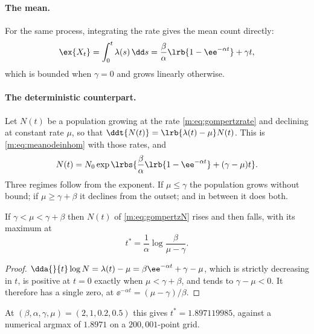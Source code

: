\paragraph{The mean.}
For the same process, integrating the rate gives the mean count directly:
\begin{equation}
\ex{X_t}=\int_0^t\lambda(s)\,\dd s
=\frac{\beta}{\alpha}\lrb{1-\ee^{-\alpha t}}+\gamma t,
\label{m:eq:gompertzmean}
\end{equation}
which is bounded when $\gamma=0$ and grows linearly otherwise.

\paragraph{The deterministic counterpart.}
Let $N(t)$ be a population growing at the rate \cref{m:eq:gompertzrate} and
declining at constant rate $\mu$, so that
$\ddt{N(t)}=\lrb{\lambda(t)-\mu}N(t)$. This is
\cref{m:eq:meanodeinhom} with those rates, and
\begin{equation}
N(t)=N_0\exp\lrbs{\frac{\beta}{\alpha}\lrb{1-\ee^{-\alpha t}}+(\gamma-\mu)t}.
\label{m:eq:gompertzN}
\end{equation}
Three regimes follow from the exponent. If $\mu\le\gamma$ the population
grows without bound; if $\mu\ge\gamma+\beta$ it declines from the outset;
and in between it does both.

\begin{proposition}
\label{m:prop:gompertzpeak}
If $\gamma<\mu<\gamma+\beta$ then $N(t)$ of \cref{m:eq:gompertzN} rises and
then falls, with its maximum at
\begin{equation}
t^{\ast}=\frac{1}{\alpha}\log\frac{\beta}{\mu-\gamma}.
\label{m:eq:gompertzpeak}
\end{equation}
\end{proposition}

\begin{proof}
$\dda{}{t}\log N=\lambda(t)-\mu=\beta\ee^{-\alpha t}+\gamma-\mu$, which is
strictly decreasing in $t$, is positive at $t=0$ exactly when
$\mu<\gamma+\beta$, and tends to $\gamma-\mu<0$. It therefore has a single
zero, at $\ee^{-\alpha t}=(\mu-\gamma)/\beta$.
\end{proof}

At $(\beta,\alpha,\gamma,\mu)=(2,1,0.2,0.5)$ this gives
$t^{\ast}=1.897119985$, against a numerical argmax of $1.8971$ on a
$200{,}001$-point grid.
